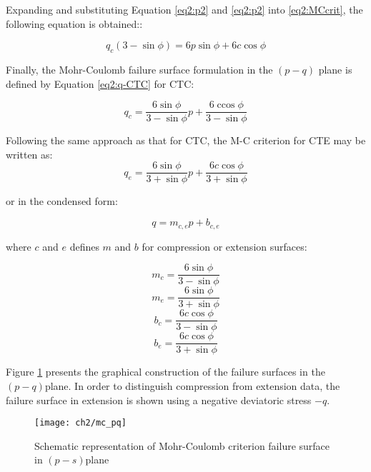 Expanding and substituting Equation \ref{eq2:p2} and \ref{eq2:p2} into \ref{eq2:MCcrit}, the following equation is obtained:: 

\begin{equation}
    q_c(3-\sin \phi) = 6p \sin \phi + 6 c\cos \phi
\end{equation}

Finally, the Mohr-Coulomb failure surface formulation in the $(p-q)$ plane is defined by Equation \ref{eq2:q-CTC} for CTC:

\begin{equation}\label{eq2:q-CTC}
    q_c=\frac{6 \sin \phi}{3-\sin \phi} p+\frac{6 \operatorname{ccos} \phi}{3-\sin \phi} 
\end{equation}

Following the same approach as that for CTC, the M-C criterion for CTE may be written as:
\begin{equation}\label{eq2:q-CTE}
    q_e=\frac{6 \sin \phi}{3+\sin \phi} p+\frac{6 c \cos \phi}{3+\sin \phi}
\end{equation}

or in the condensed form: 

\begin{equation}\label{MC_q}
    q = m_{c,e} p + b_{c,e}
\end{equation}

where $c$ and $e$  defines $m$ and $b$ for compression or extension surfaces:

\begin{equation}\label{eq2:MC_mc_q}
    m_c=\frac{6 \sin \phi}{3-\sin \phi} 
\end{equation}
\begin{equation}\label{eq2:MC_me_q}
    m_e=\frac{6 \sin \phi}{3+\sin \phi} 
\end{equation}
\begin{equation}\label{eq2:MC_bc_q}
    b_c=\frac{6 c \cos \phi}{3-\sin \phi}
\end{equation}
\begin{equation}\label{eq2:MC_be_q}
    b_e=\frac{6 c \cos \phi}{3+\sin \phi}
\end{equation}

Figure \ref{fig2:mc_pq} presents the graphical construction of the failure surfaces in the  $(p-q)$plane. In order to distinguish compression from extension data, the failure surface in extension is shown using a negative deviatoric stress $-q$. 

\begin{figure}[tb]
    \centering
    \texttt{[image: ch2/mc\_pq]}
    \caption{Schematic representation of Mohr-Coulomb criterion failure surface in  $(p-s)$plane}
    \label{fig2:mc_pq}
\end{figure} 

